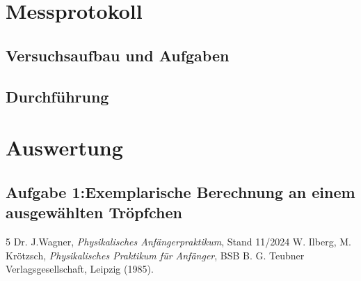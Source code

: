 \documentclass[12pt,a4paper,titlepage]{scrartcl}
\numberwithin{equation}{section}
\numberwithin{table}{section}
\numberwithin{figure}{section}
\begin{document}
\section{Messprotokoll}

\subsection{Versuchsaufbau und Aufgaben}

\subsection{Durchführung}

\section{Auswertung}

\subsection{Aufgabe 1:Exemplarische Berechnung an einem ausgewählten Tröpfchen}




\clearpage

\listoffigures


\listoftables

\begin{thebibliography}{5}
     Dr. J.Wagner, \emph{Physikalisches Anfängerpraktikum}, Stand 11/2024
     W. Ilberg, M. Krötzsch, \emph{Physikalisches Praktikum für Anfänger}, BSB B. G. Teubner Verlagsgesellschaft, Leipzig (1985).
\end{thebibliography}
\end{document}
